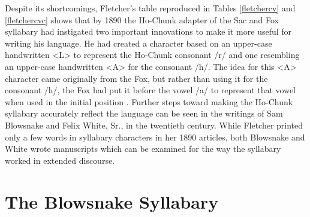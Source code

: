 \documentclass[output=paper]{LSP/langsci}
\begin{document}
Despite its shortcomings, Fletcher's table reproduced in Tables \ref{fletchercv} and \ref{fletchercvc} shows that by 1890 the Ho-Chunk adapter of the Sac and Fox syllabary had instigated two important innovations to make it more useful for writing his language. He had created a character based on an upper-case handwritten <L> to represent the Ho-Chunk consonant /r/ and one resembling an upper-case handwritten <A> for the consonant /h/. The idea for this <A> character came originally from the Fox, but rather than using it for the consonant /h/, the Fox had put it before the vowel /a/ to represent that vowel when used in the initial position \citep[170]{Walker1996}. Further steps toward making the Ho-Chunk syllabary accurately reflect the language can be seen in the writings of Sam Blowsnake and Felix White, Sr., in the twentieth century. While Fletcher printed only a few words in syllabary characters in her 1890 articles, both Blowsnake and White wrote manuscripts which can be examined for the way the syllabary worked in extended discourse. 

\section{The Blowsnake Syllabary}
\end{document}
